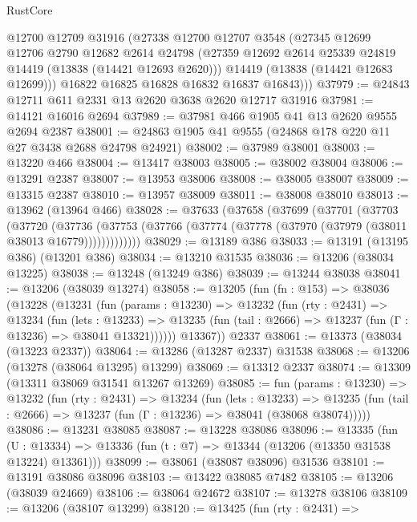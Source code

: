 \begin{lexlean}{RustCore}
\begin{coremodule}
        @12700
        @12709
        @31916
        (@27338
          @12700
          @12707
          @3548
          (@27345
            @12699
            @12706
            @2790
            @12682
            @2614
            @24798
            (@27359 @12692 @2614 @25339 @24819 @14419 (@13838 (@14421 @12693 @2620)))
            @14419
            (@13838 (@14421 @12683 @12699)))
          @16822
          @16825
          @16828
          @16832
          @16837
          @16843)))
@37979 := @24843 @12711 @611 @2331 @13 @2620 @3638 @2620 @12717 @31916
@37981 := @14121 @16016 @2694
@37989 := @37981 @466 @1905 @41 @13 @2620 @9555 @2694 @2387
@38001 := @24863 @1905 @41 @9555 (@24868 @178 @220 @11 @27 @3438 @2688 @24798 @24921)
@38002 := @37989 @38001
@38003 := @13220 @466
@38004 := @13417 @38003
@38005 := @38002 @38004
@38006 := @13291 @2387
@38007 := @13953 @38006
@38008 := @38005 @38007
@38009 := @13315 @2387
@38010 := @13957 @38009
@38011 := @38008 @38010
@38013 := @13962 (@13964 @466)
@38028 := @37633
    (@37658
      (@37699
        (@37701
          (@37703
            (@37720
              (@37736
                (@37753 (@37766 (@37774 (@37778 (@37970 (@37979 (@38011 @38013 @16779)))))))))))))
@38029 := @13189 @386
@38033 := @13191 (@13195 @386) (@13201 @386)
@38034 := @13210 @31535
@38036 := @13206 (@38034 @13225)
@38038 := @13248 (@13249 @386)
@38039 := @13244 @38038
@38041 := @13206 (@38039 @13274)
@38058 := @13205
    (fun (fn : @153) =>
    @38036
      (@13228
        (@13231
          (fun (params : @13230) =>
          @13232
            (fun (rty : @2431) =>
            @13234
              (fun (lets : @13233) =>
              @13235 (fun (tail : @2666) => @13237 (fun (Γ : @13236) => @38041 @13321))))))
        @13367))
    @2337
@38061 := @13373 (@38034 (@13223 @2337))
@38064 := @13286 (@13287 @2337) @31538
@38068 := @13206 (@13278 (@38064 @13295) @13299)
@38069 := @13312 @2337
@38074 := @13309 (@13311 @38069 @31541 @13267 @13269)
@38085 := fun (params : @13230) =>
  @13232
    (fun (rty : @2431) =>
    @13234
      (fun (lets : @13233) =>
      @13235 (fun (tail : @2666) => @13237 (fun (Γ : @13236) => @38041 (@38068 @38074)))))
@38086 := @13231 @38085
@38087 := @13228 @38086
@38096 := @13335
    (fun (U : @13334) => @13336 (fun (t : @7) => @13344 (@13206 (@13350 @31538 @13224) @13361)))
@38099 := @38061 (@38087 @38096) @31536
@38101 := @13191 @38086 @38096
@38103 := @13422 @38085 @7482
@38105 := @13206 (@38039 @24669)
@38106 := @38064 @24672
@38107 := @13278 @38106
@38109 := @13206 (@38107 @13299)
@38120 := @13425
    (fun (rty : @2431) =>

\end{coremodule}
\end{lexlean}
